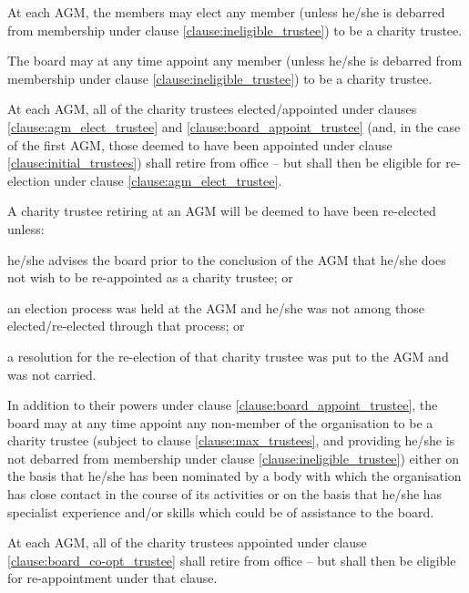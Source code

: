 ﻿\documentclass[a4paper,11pt,onecolumn ]{article}
\begin{document}
\begin{legal}
\item \label{clause:agm_elect_trustee} At each AGM, the members may elect any member (unless he/she is debarred from membership under clause \ref{clause:ineligible_trustee}) to be a charity trustee.
\item \label{clause:board_appoint_trustee} The board may at any time appoint any member (unless he/she is debarred from membership under clause \ref{clause:ineligible_trustee}) to be a charity trustee.
\item At each AGM, all of the charity trustees elected/appointed under clauses \ref{clause:agm_elect_trustee} and \ref{clause:board_appoint_trustee} (and, in the case of the first AGM, those deemed to have been appointed under clause \ref{clause:initial_trustees}) shall retire from office – but shall then be eligible for re-election under clause \ref{clause:agm_elect_trustee}. 
\item \label{clause:trustee_re-election} A charity trustee retiring at an AGM will be deemed to have been re-elected unless:
    \begin{legal}
    \item he\slash she advises the board prior to the conclusion of the AGM that he\slash she does not wish to be re-appointed as a charity trustee; or
    \item an election process was held at the AGM and he/she was not among those elected/re-elected through that process; or 
    \item a resolution for the re-election of that charity trustee was put to the AGM and was not carried.
    \end{legal}
\end{legal}

\begin{legal}
\item \label{clause:board_co-opt_trustee} In addition to their powers under clause \ref{clause:board_appoint_trustee}, the board may at any time appoint any non-member of the organisation to be a charity trustee (subject to clause \ref{clause:max_trustees}, and providing he/she is not debarred from membership under clause \ref{clause:ineligible_trustee}) either on the basis that he/she has been nominated by a body with which the organisation has close contact in the course of its activities or on the basis that he/she has specialist experience and/or skills which could be of assistance to the board.
\item \label{clause:co-opted_retiral} At each AGM, all of the charity trustees appointed under clause \ref{clause:board_co-opt_trustee} shall retire from office – but shall then be eligible for re-appointment under that clause.
\end{legal}
\end{document}
